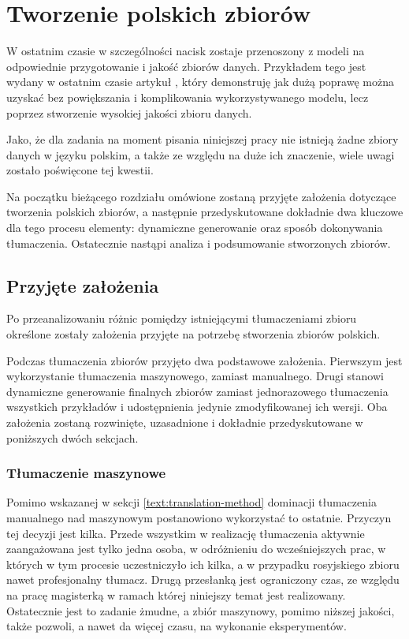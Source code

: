 \chapter{Tworzenie polskich zbiorów}
W ostatnim czasie w szczególności nacisk zostaje przenoszony z modeli na odpowiednie przygotowanie i jakość zbiorów danych. Przykładem tego jest wydany w ostatnim czasie artykuł  , który demonstruję jak dużą poprawę można uzyskać bez powiększania i komplikowania wykorzystywanego modelu, lecz poprzez stworzenie wysokiej jakości zbioru danych.

Jako, że dla zadania  na moment pisania niniejszej pracy nie istnieją żadne zbiory danych w języku polskim, a także ze względu na duże ich znaczenie, wiele uwagi zostało poświęcone tej kwestii. 

Na początku bieżącego rozdziału omówione zostaną przyjęte założenia dotyczące tworzenia polskich zbiorów, a następnie przedyskutowane dokładnie dwa kluczowe dla tego procesu elementy: dynamiczne generowanie oraz sposób dokonywania tłumaczenia. Ostatecznie nastąpi analiza i podsumowanie stworzonych zbiorów.

\section{Przyjęte założenia}
Po przeanalizowaniu różnic pomiędzy istniejącymi tłumaczeniami zbioru  określone zostały założenia przyjęte na potrzebę stworzenia zbiorów polskich.

Podczas tłumaczenia zbiorów przyjęto dwa podstawowe założenia. Pierwszym jest wykorzystanie tłumaczenia maszynowego, zamiast manualnego. Drugi stanowi dynamiczne generowanie finalnych zbiorów zamiast jednorazowego tłumaczenia wszystkich przykładów i udostępnienia jedynie zmodyfikowanej ich wersji. Oba założenia zostaną rozwinięte, uzasadnione i dokładnie przedyskutowane w poniższych dwóch sekcjach.

\subsection{Tłumaczenie maszynowe}
Pomimo wskazanej w sekcji \ref{text:translation-method} dominacji tłumaczenia manualnego nad maszynowym postanowiono wykorzystać to ostatnie. Przyczyn tej decyzji jest kilka. Przede wszystkim w realizację tłumaczenia aktywnie zaangażowana jest tylko jedna osoba, w odróżnieniu do wcześniejszych prac, w których w tym procesie uczestniczyło ich kilka, a w przypadku rosyjskiego zbioru nawet profesjonalny tłumacz. Drugą przesłanką jest ograniczony czas, ze względu na pracę magisterką w ramach której niniejszy temat jest realizowany. Ostatecznie jest to zadanie żmudne, a zbiór maszynowy, pomimo niższej jakości, także pozwoli, a nawet da więcej czasu, na wykonanie eksperymentów.

